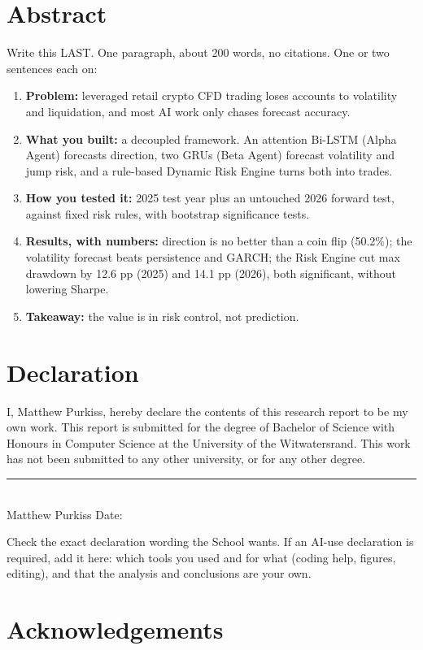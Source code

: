 \section*{Abstract}

\begin{guide}
Write this LAST. One paragraph, about 200 words, no citations. One or two sentences each on:
\begin{enumerate}
  \item \textbf{Problem:} leveraged retail crypto CFD trading loses accounts to volatility and liquidation, and most AI work only chases forecast accuracy.
  \item \textbf{What you built:} a decoupled framework. An attention Bi-LSTM (Alpha Agent) forecasts direction, two GRUs (Beta Agent) forecast volatility and jump risk, and a rule-based Dynamic Risk Engine turns both into trades.
  \item \textbf{How you tested it:} 2025 test year plus an untouched 2026 forward test, against fixed risk rules, with bootstrap significance tests.
  \item \textbf{Results, with numbers:} direction is no better than a coin flip (50.2\%); the volatility forecast beats persistence and GARCH; the Risk Engine cut max drawdown by 12.6 pp (2025) and 14.1 pp (2026), both significant, without lowering Sharpe.
  \item \textbf{Takeaway:} the value is in risk control, not prediction.
\end{enumerate}
\end{guide}


\section*{Declaration}

I, Matthew Purkiss, hereby declare the contents of this research report to be my own work. This report is submitted for the degree of Bachelor of Science with Honours in Computer Science at the University of the Witwatersrand. This work has not been submitted to any other university, or for any other degree.

\vspace{1.5cm}
\noindent\rule{6cm}{0.4pt}\\
Matthew Purkiss \hfill Date: 

\begin{guide}
Check the exact declaration wording the School wants. If an AI-use declaration is required, add it here: which tools you used and for what (coding help, figures, editing), and that the analysis and conclusions are your own.
\end{guide}

\section*{Acknowledgements}

\clearpage
\tableofcontents
